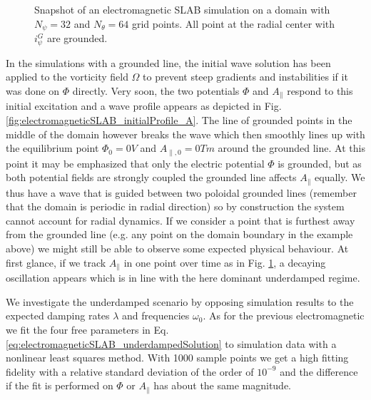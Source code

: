 \begin{figure}[H]
\begin{subfigure}[b]{0.45\textwidth}
		\label{fig:electromagneticSLAB_evolution_A}
	\end{subfigure}
	\caption{Snapshot of an electromagnetic SLAB simulation on a domain with $N_\psi=32$ and $N_\theta=64$ grid points. All point at the radial center with $i_\psi^G$ are grounded.}
	\label{fig:electromagneticGroundedSLAB_system}
\end{figure}

In the simulations with a grounded line, the initial wave solution has been applied to the vorticity field $\Omega$ to prevent steep gradients and instabilities if it was done on $\Phi$ directly. Very soon, the two potentials $\Phi$ and $A_\parallel$ respond to this initial excitation and a wave profile appears as depicted in Fig. \ref{fig:electromagneticSLAB_initialProfile_A}. The line of grounded points in the middle of the domain however breaks the wave which then smoothly lines up with the equilibrium point $\Phi_0 = 0V$ and $A_{\parallel,0} = 0Tm$ around the grounded line. At this point it may be emphasized that only the electric potential $\Phi$ is grounded, but as both potential fields are strongly coupled the grounded line affects $A_\parallel$ equally. We thus have a wave that is guided between two poloidal grounded lines (remember that the domain is periodic in radial direction) so by construction the system cannot account for radial dynamics. If we consider a point that is furthest away from the grounded line (e.g. any point on the domain boundary in the example above) we might still be able to observe some expected physical behaviour. At first glance, if we track $A_\parallel$ in one point over time as in Fig. \ref{fig:electromagneticSLAB_evolution_A}, a decaying oscillation appears which is in line with the here dominant underdamped regime. 	

We investigate the underdamped scenario by opposing simulation results to the expected damping rates $\lambda$ and frequencies $\omega_0$. As for the previous electromagnetic we fit the four free parameters in Eq. \ref{eq:electromagneticSLAB_underdampedSolution} to simulation data with a nonlinear least squares method. With 1000 sample points we get a high fitting fidelity with a relative standard deviation of the order of $10^{-9}$ and the difference if the fit is performed on $\Phi$ or $A_\parallel$ has about the same magnitude. 

